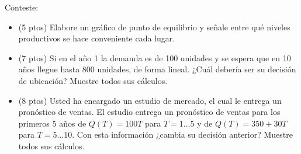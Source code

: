 \documentclass[11pt, a4paper]{article}
\begin{document}
  Conteste:
  \begin{itemize}
    \item[\textbf{i.}] (5 ptos) Elabore un gráfico de punto de equilibrio y señale entre qué niveles productivos se hace conveniente cada lugar.
    \item[\textbf{ii.}] (7 ptos) Si en el año 1 la demanda es de 100 unidades y se espera que en 10 años llegue hasta 800 unidades, de forma lineal. ¿Cuál debería ser su decisión de ubicación? Muestre todos sus cálculos.
    \item[\textbf{iii.}] (8 ptos) Usted ha encargado un estudio de mercado, el cual le entrega un pronóstico de ventas. El estudio entrega un pronóstico de ventas para los primeros 5 años de $Q(T) = 100T$ para $T=1 \dots 5$ y de $Q(T) = 350 + 30T$ para $T=5 \dots 10$. Con esta información ¿cambia su decisión anterior? Muestre todos sus cálculos.
  \end{itemize}
\end{document}
